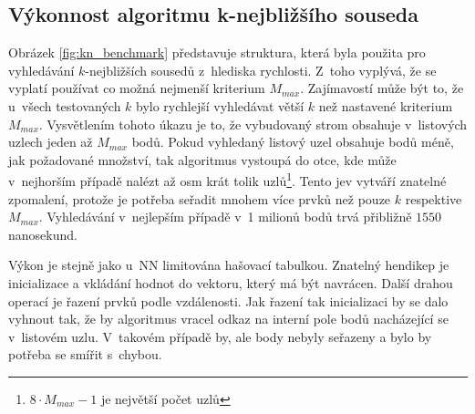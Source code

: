 \subsection*{Výkonnost algoritmu k-nejbližšího souseda}
Obrázek \ref{fig:kn_benchmark} představuje struktura, která byla použita pro vyhledávání $k$-nejbližších sousedů z~hlediska rychlosti. Z~toho vyplývá, že se vyplatí používat co možná nejmenší kriterium $M_{max}$. Zajímavostí může být to, že u~všech testovaných $k$ bylo rychlejší vyhledávat větší $k$ než nastavené kriterium $M_{max}$. Vysvětlením tohoto úkazu je to, že vybudovaný strom obsahuje v~listových uzlech jeden až $M_{max}$ bodů. Pokud vyhledaný listový uzel obsahuje bodů méně, jak požadované množství, tak algoritmus vystoupá do otce, kde může v~nejhorším případě nalézt až osm krát tolik uzlů\footnote{$8 \cdot M_{max} -1$ je největší počet uzlů}. Tento jev vytváří znatelné zpomalení, protože je potřeba seřadit mnohem více prvků než pouze $k$ respektive $M_{max}$. Vyhledávání v~nejlepším případě v~1 milionů bodů trvá  přibližně $1550$ nanosekund.

Výkon je stejně jako u~NN limitována hašovací tabulkou. Znatelný hendikep je inicializace a vkládání hodnot do vektoru, který má být navrácen. Další drahou operací je řazení prvků podle vzdálenosti. Jak řazení tak inicializaci by se dalo vyhnout tak, že by algoritmus vracel odkaz na interní pole bodů nacházející se v~listovém uzlu. V~takovém případě by, ale body nebyly seřazeny a bylo by potřeba se smířit s~chybou.

